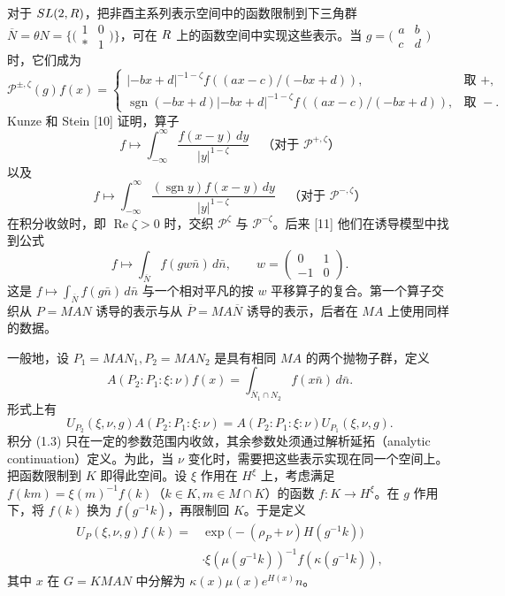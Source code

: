 对于 $SL(2,R)$，把非酉主系列表示空间中的函数限制到下三角群 $\overline N=\theta N=\{\bigl(\begin{smallmatrix}1&0\\ *&1\end{smallmatrix}\bigr)\}$，可在 $R$ 上的函数空间中实现这些表示。当 $g=\bigl(\begin{smallmatrix}a&b\\c&d\end{smallmatrix}\bigr)$ 时，它们成为
\[
 \mathcal P^{\pm,\zeta}(g)f(x)=
 \begin{cases}
 |-bx+d|^{-1-\zeta}f((ax-c)/(-bx+d)),&\text{取 }+,\\
 \operatorname{sgn}(-bx+d)|-bx+d|^{-1-\zeta}f((ax-c)/(-bx+d)),&\text{取 }-.
 \end{cases}
\]
Kunze 和 Stein [10] 证明，算子
\begin{equation}
 f\longmapsto\int_{-\infty}^\infty\frac{f(x-y)\,dy}{|y|^{1-\zeta}}
 \quad\text{（对于 }\mathcal P^{+,\zeta}\text{）}
 \tag{1.2a}
\end{equation}
以及
\begin{equation}
 f\longmapsto\int_{-\infty}^\infty\frac{(\operatorname{sgn}y)f(x-y)\,dy}{|y|^{1-\zeta}}
 \quad\text{（对于 }\mathcal P^{-,\zeta}\text{）}
 \tag{1.2b}
\end{equation}
在积分收敛时，即 $\operatorname{Re}\zeta>0$ 时，交织 $\mathcal P^\zeta$ 与 $\mathcal P^{-\zeta}$。后来 [11] 他们在诱导模型中找到公式
\[
 f\longmapsto\int_{\overline N}f(gw\bar n)\,d\bar n,
 \qquad w=\begin{pmatrix}0&1\\-1&0\end{pmatrix}.
\]
这是 $f\mapsto\int_{\overline N}f(g\bar n)\,d\bar n$ 与一个相对平凡的按 $w$ 平移算子的复合。第一个算子交织从 $P=MAN$ 诱导的表示与从 $\overline P=MA\overline N$ 诱导的表示，后者在 $MA$ 上使用同样的数据。

一般地，设 $P_1=MAN_1,P_2=MAN_2$ 是具有相同 $MA$ 的两个抛物子群，定义
\begin{equation}
 A(P_2:P_1:\xi:\nu)f(x)=\int_{\overline N_1\cap N_2}f(x\bar n)\,d\bar n.
 \tag{1.3}
\end{equation}
形式上有
\begin{equation}
 U_{P_2}(\xi,\nu,g)A(P_2:P_1:\xi:\nu)
 =A(P_2:P_1:\xi:\nu)U_{P_1}(\xi,\nu,g).
 \tag{1.4}
\end{equation}
积分 (1.3) 只在一定的参数范围内收敛，其余参数处须通过解析延拓（analytic continuation）定义。为此，当 $\nu$ 变化时，需要把这些表示实现在同一个空间上。把函数限制到 $K$ 即得此空间。设 $\xi$ 作用在 $H^\xi$ 上，考虑满足 $f(km)=\xi(m)^{-1}f(k)$（$k\in K,m\in M\cap K$）的函数 $f:K\to H^\xi$。在 $g$ 作用下，将 $f(k)$ 换为 $f(g^{-1}k)$，再限制回 $K$。于是定义
\begin{equation}
 \begin{split}
 U_P(\xi,\nu,g)f(k)
 ={}&\exp\bigl(- (\rho_P+\nu)H(g^{-1}k)\bigr)\\
 &\cdot\xi(\mu(g^{-1}k))^{-1}f(\kappa(g^{-1}k)),
 \end{split}
 \tag{1.5}
\end{equation}
其中 $x$ 在 $G=KMAN$ 中分解为 $\kappa(x)\mu(x)e^{H(x)}n$。

